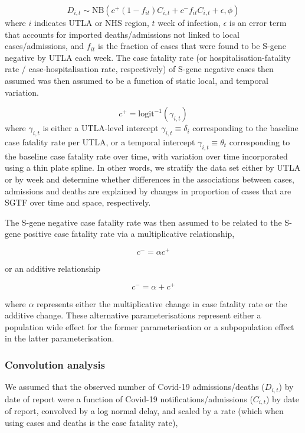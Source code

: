 \documentclass[
]{article}
\begin{document}
\[D_{i,t} \sim \mathrm{NB}\left(c^{+}\left(1-f_{it}\right)C_{i,t} + c^{-}f_{it}C_{i,t} + \epsilon,  \phi \right)\]
where \(i\) indicates UTLA or NHS region, \(t\) week of infection,
\(\epsilon\) is an error term that accounts for imported
deaths/admissions not linked to local cases/admissions, and \(f_{it}\)
is the fraction of cases that were found to be S-gene negative by UTLA
each week. The case fatality rate (or hospitalisation-fatality rate /
case-hospitalisation rate, respectively) of S-gene negative cases then
assumed was then assumed to be a function of static local, and temporal
variation.

\[c^{+} = \mathrm{logit}^{-1}\left(\gamma_{i,t}\right)\] where
\(\gamma_{i,t}\) is either a UTLA-level intercept
\(\gamma_{i,t}\equiv \delta_i\) corresponding to the baseline case
fatality rate per UTLA, or a temporal intercept
\(\gamma_{i,t}\equiv \theta_t\) corresponding to the baseline case
fatality rate over time, with variation over time incorporated using a
thin plate spline. In other words, we stratify the data set either by
UTLA or by week and determine whether differences in the associations
between cases, admissions and deaths are explained by changes in
proportion of cases that are SGTF over time and space, respectively.

The S-gene negative case fatality rate was then assumed to be related to
the S-gene positive case fatality rate via a multiplicative
relationship,

\[c^{-} = \alpha c^{+}\]

or an additive relationship

\[c^{-} = \alpha + c^{+}\]

where \(\alpha\) represents either the multiplicative change in case
fatality rate or the additive change. These alternative
parameterisations represent either a population wide effect for the
former parameterisation or a subpopulation effect in the latter
parameterisation.

\hypertarget{convolution-analysis}{%
\subsubsection{Convolution analysis}\label{convolution-analysis}}

We assumed that the observed number of Covid-19 admissions/deaths
(\(D_{i,t}\)) by date of report were a function of Covid-19
notifications/admissions (\(C_{i,t}\)) by date of report, convolved by a
log normal delay, and scaled by a rate (which when using cases and
deaths is the case fatality rate),
\end{document}
